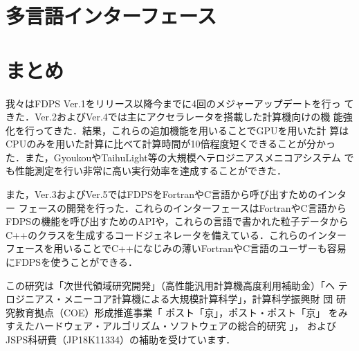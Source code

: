 \documentclass[submit]{ipsj}
\begin{document}
\section{多言語インターフェース}
\label{sec:if}



\section{まとめ}

我々はFDPS Ver.1をリリース以降今までに4回のメジャーアップデートを行っ
てきた．Ver.2およびVer.4では主にアクセラレータを搭載した計算機向けの機
能強化を行ってきた．結果，これらの追加機能を用いることでGPUを用いた計
算はCPUのみを用いた計算に比べて計算時間が10倍程度短くできることが分かっ
た．また，GyoukouやTaihuLight等の大規模ヘテロジニアスメニコアシステム
でも性能測定を行い非常に高い実行効率を達成することができた．

また，Ver.3およびVer.5ではFDPSをFortranやC言語から呼び出すためのインター
フェースの開発を行った．これらのインターフェースはFortranやC言語から
FDPSの機能を呼び出すためのAPIや，これらの言語で書かれた粒子データから
C++のクラスを生成するコードジェネレータを備えている．これらのインター
フェースを用いることでC++になじみの薄いFortranやC言語のユーザーも容易
にFDPSを使うことができる．

\begin{acknowledgment}

この研究は「次世代領域研究開発」（高性能汎用計算機高度利用補助金）「ヘ
  テロジニアス・メニーコア計算機による大規模計算科学」，計算科学振興財
団 研究教育拠点（COE）形成推進事業「 ポスト「京」，ポスト・ポスト「京」
  をみすえたハードウェア・アルゴリズム・ソフトウェアの総合的研究 」，
およびJSPS科研費（JP18K11334）の補助を受けています．

\end{acknowledgment}

%
\end{document}
